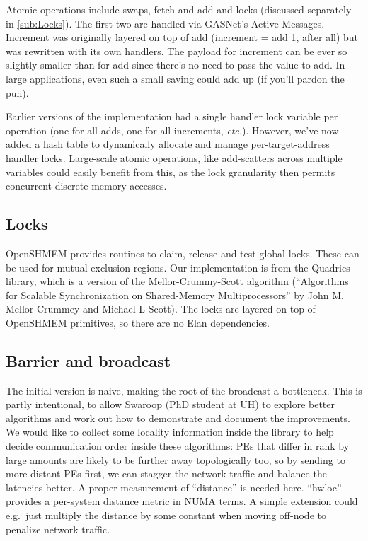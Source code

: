 \documentclass[english]{article}
\begin{document}
Atomic operations include swaps, fetch-and-add and locks (discussed
separately in \ref{sub:Locks}). The first two are handled via GASNet's
Active Messages. Increment was originally layered on top of add
(increment = add 1, after all) but was rewritten with its own
handlers. The payload for increment can be ever so slightly smaller
than for add since there's no need to pass the value to add. In large
applications, even such a small saving could add up (if you'll pardon
the pun).

Earlier versions of the implementation had a single handler lock
variable per operation (one for all adds, one for all increments,
\emph{etc.}).  However, we've now added a hash table to dynamically
allocate and manage per-target-address handler locks. Large-scale
atomic operations, like add-scatters across multiple variables could
easily benefit from this, as the lock granularity then permits
concurrent discrete memory accesses.

\subsection{\label{sub:Locks}Locks}

OpenSHMEM provides routines to claim, release and test global locks.
These can be used for mutual-exclusion regions. Our implementation is
from the Quadrics library, which is a version of the
Mellor-Crummy-Scott algorithm (``Algorithms for Scalable
Synchronization on Shared-Memory Multiprocessors'' by John
M. Mellor-Crummey and Michael L Scott).  The locks are layered on top
of OpenSHMEM primitives, so there are no Elan dependencies.

\subsection{Barrier and broadcast}

The initial version is naive, making the root of the broadcast a
bottleneck.  This is partly intentional, to allow Swaroop (PhD student
at UH) to explore better algorithms and work out how to demonstrate
and document the improvements. We would like to collect some locality
information inside the library to help decide communication order
inside these algorithms: PEs that differ in rank by large amounts are
likely to be further away topologically too, so by sending to more
distant PEs first, we can stagger the network traffic and balance the
latencies better. A proper measurement of ``distance'' is needed
here. ``hwloc'' provides a per-system distance metric in NUMA
terms. A simple extension could e.g.\ just multiply the distance
by some constant when moving off-node to penalize network traffic.
\end{document}
